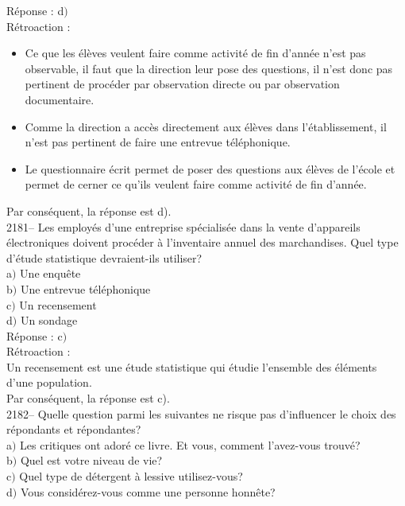 \documentclass[letterpaper, 12pt]{article}
\begin{document}
R\'eponse : d$)$\\

R\'etroaction :
\begin{itemize}
 \item Ce que les \'el\`eves veulent faire comme activit\'e de fin d'ann\'ee n'est pas observable, il faut que la direction leur pose des questions, il n'est donc pas pertinent de proc\'eder par observation directe ou par observation documentaire.
\item Comme la direction a acc\`es directement aux \'el\`eves dans l'\'etablissement, il n'est pas pertinent de faire une entrevue t\'el\'ephonique.
\item Le questionnaire \'ecrit permet de poser des questions aux \'el\`eves de l'\'ecole et permet de cerner ce qu'ils veulent faire comme activit\'e de fin d'ann\'ee.
\end{itemize}
Par cons\'equent, la r\'eponse est d).\\

2181-- Les employ\'es d'une entreprise sp\'ecialis\'ee dans la vente d'appareils \'electroniques doivent proc\'eder \`a l'inventaire annuel des marchandises. Quel type d'\'etude statistique devraient-ils utiliser?\\

a$)$ Une enqu\^ete\\
b$)$ Une entrevue t\'el\'ephonique\\
c$)$ Un recensement\\
d$)$ Un sondage\\

R\'eponse : c$)$\\

R\'etroaction :\\
Un recensement est une \'etude statistique qui \'etudie l'ensemble des \'el\'ements d'une population.\\
Par cons\'equent, la r\'eponse est c).\\


2182-- Quelle question parmi les suivantes ne risque pas d'influencer le choix des r\'epondants et r\'epondantes? \\

a$)$ Les critiques ont ador\'e ce livre. Et vous, comment l'avez-vous trouv\'e?\\
b$)$ Quel est votre niveau de vie?  \\
c$)$ Quel type de d\'etergent \`a lessive utilisez-vous?\\
d$)$ Vous consid\'erez-vous comme une personne honn\^ete?\\
\end{document}
